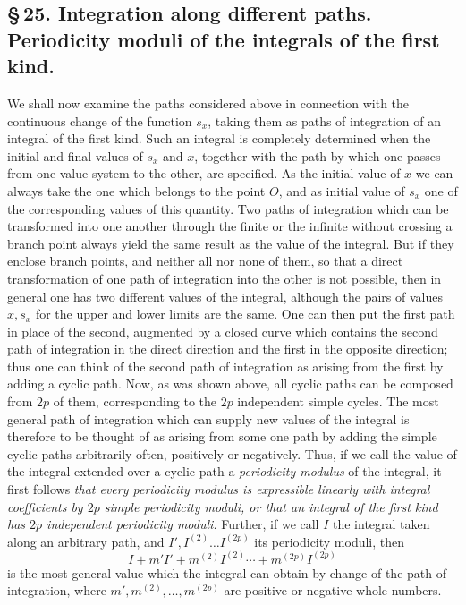 \documentclass[10pt]{article}
\begin{document}
\subsection*{\S\,25. Integration along different paths. Periodicity moduli of the integrals of the first kind.}

We shall now examine the paths considered above in connection with the continuous change of the function \(s_x\), taking them as paths of integration of an integral of the first kind. Such an integral is completely determined when the initial and final values of \(s_x\) and \(x\), together with the path by which one passes from one value system to the other, are specified. As the initial value of \(x\) we can always take the one which belongs to the point \(O\), and as initial value of \(s_x\) one of the corresponding values of this quantity. Two paths of integration which can be transformed into one another through the finite or the infinite without crossing a branch point always yield the same result as the value of the integral. But if they enclose branch points, and neither all nor none of them, so that a direct transformation of one path of integration into the other is not possible, then in general one has two different values of the integral, although the pairs of values \(x,s_x\) for the upper and lower limits are the same. One can then put the first path in place of the second, augmented by a closed curve which contains the second path of integration in the direct direction and the first in the opposite direction; thus one can think of the second path of integration as arising from the first by adding a cyclic path. Now, as was shown above, all cyclic paths can be composed from \(2p\) of them, corresponding to the \(2p\) independent simple cycles. The most general path of integration which can supply new values of the integral is therefore to be thought of as arising from some one path by adding the simple cyclic paths arbitrarily often, positively or negatively. Thus, if we call the value of the integral extended over a cyclic path a \emph{periodicity modulus} of the integral, it first follows \emph{that every periodicity modulus is expressible linearly with integral coefficients by \(2p\) simple periodicity moduli, or that an integral of the first kind has \(2p\) independent periodicity moduli.} Further, if we call \(I\) the integral taken along an arbitrary path, and \(I',I^{(2)}\ldots I^{(2p)}\) its periodicity moduli, then
\[
I+m'I'+m^{(2)}I^{(2)}\cdots+m^{(2p)}I^{(2p)}
\]
is the most general value which the integral can obtain by change of the path of integration, where \(m',m^{(2)},\ldots,m^{(2p)}\) are positive or negative whole numbers.
\end{document}
